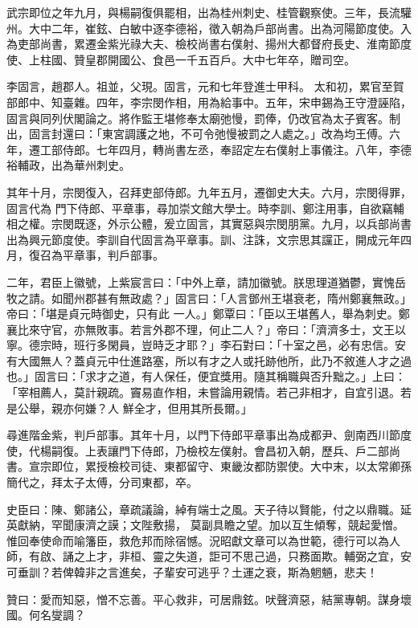 \begin{pinyinscope}
 武宗即位之年九月，與楊嗣復俱罷相，出為桂州刺史、桂管觀察使。三年，長流驩州。大中二年，崔鉉、白敏中逐李德裕，徵入朝為戶部尚書。出為河陽節度使。入為吏部尚書，累遷金紫光祿大夫、檢校尚書右僕射、揚州大都督府長史、淮南節度使、上柱國、贊皇郡開國公、食邑一千五百戶。大中七年卒，贈司空。



 李固言，趙郡人。祖並，父現。固言，元和七年登進士甲科。
 太和初，累官至賀部郎中、知臺雜。四年，李宗閔作相，用為給事中。五年，宋申錫為王守澄誣陷，固言與同列伏閣論之。將作監王堪修奉太廟弛慢，罰俸，仍改官為太子賓客。制出，固言封還曰：「東宮調護之地，不可令弛慢被罰之人處之。」改為均王傅。六年，遷工部侍郎。七年四月，轉尚書左丞，奉詔定左右僕射上事儀注。八年，李德裕輔政，出為華州刺史。



 其年十月，宗閔復入，召拜吏部侍郎。九年五月，遷御史大夫。六月，宗閔得罪，固言代為
 門下侍郎、平章事，尋加崇文館大學士。時李訓、鄭注用事，自欲竊輔相之權。宗閔既逐，外示公體，爰立固言，其實惡與宗閔朋黨。九月，以兵部尚書出為興元節度使。李訓自代固言為平章事。訓、注誅，文宗思其讜正，開成元年四月，復召為平章事，判戶部事。



 二年，君臣上徽號，上紫宸言曰：「中外上章，請加徽號。朕思理道猶鬱，實愧岳牧之請。如聞州郡甚有無政處？」固言曰：「人言鄧州王堪衰老，隋州鄭襄無政。」帝曰：「堪是貞元時御史，只有此
 一人。」鄭覃曰：「臣以王堪舊人，舉為刺史。鄭襄比來守官，亦無敗事。若言外郡不理，何止二人？」帝曰：「濟濟多士，文王以寧。德宗時，班行多閑員，豈時乏才耶？」李石對曰：「十室之邑，必有忠信。安有大國無人？蓋貞元中仕進路塞，所以有才之人或托跡他所，此乃不敘進人才之過也。」固言曰：「求才之道，有人保任，便宜獎用。隨其稱職與否升黜之。」上曰：「宰相薦人，莫計親疏。竇易直作相，未嘗論用親情。若己非相才，自宜引退。若是公舉，親亦何嫌？人
 鮮全才，但用其所長爾。」



 尋進階金紫，判戶部事。其年十月，以門下侍郎平章事出為成都尹、劍南西川節度使，代楊嗣復。上表讓門下侍郎，乃檢校左僕射。會昌初入朝，歷兵、戶二部尚書。宣宗即位，累授檢校司徒、東都留守、東畿汝都防禦使。大中末，以太常卿孫簡代之，拜太子太傅，分司東都，卒。



 史臣曰：陳、鄭諸公，章疏議論，綽有端士之風。天子待以賢能，付之以鼎職。延英獻納，罕聞康濟之謨；文陛敷揚，
 莫副具瞻之望。加以互生傾奪，競起愛憎。惟回奉使命而喻籓臣，救危邦而除宿憾。況昭獻文章可以為世範，德行可以為人師，有啟、誦之上才，非桓、靈之失道，詎可不思己過，只務面欺。輔弼之宜，安可垂訓？若俾韓非之言進矣，子輩安可逃乎？土運之衰，斯為魍魎，悲夫！



 贊曰：愛而知惡，憎不忘善。平心救非，可居鼎鉉。吠聲濟惡，結黨專朝。謀身壞國。何名燮調？



\end{pinyinscope}